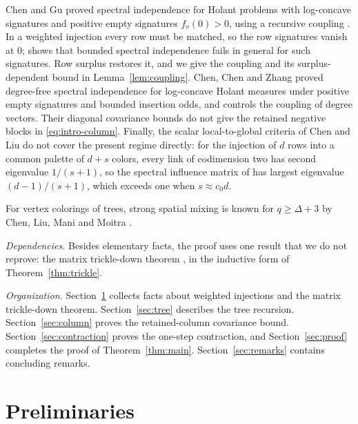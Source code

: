 \documentclass{amsart}
\numberwithin{equation}{section}
\theoremstyle{plain}
\theoremstyle{definition}
\theoremstyle{remark}
\begin{document}
Chen and Gu \cite{CG} proved spectral independence for Holant problems with log-concave signatures and positive empty signatures $f_v(0)>0$, using a recursive coupling \cite[Algorithm~1, Proposition~17 and Lemma~18]{CG}. In a weighted injection every row must be matched, so the row signatures vanish at $0$; \cite[Section~3.4]{CG} shows that bounded spectral independence fails in general for such signatures. Row surplus restores it, and we give the coupling and its surplus-dependent bound in Lemma~\ref{lem:coupling}. Chen, Chen and Zhang \cite[Theorem~4]{CCZ} proved degree-free spectral independence for log-concave Holant measures under positive empty signatures and bounded insertion odds, and \cite[Theorem~13]{CCZ} controls the coupling of degree vectors. Their diagonal covariance bounds do not give the retained negative blocks in \eqref{eq:intro-column}. Finally, the scalar local-to-global criteria of Chen and Liu \cite[Theorems~1.1 and~1.2]{CL} do not cover the present regime directly: for the injection of $d$ rows into a common palette of $d+s$ colors, every link of codimension two has second eigenvalue $1/(s+1)$, so the spectral influence matrix of \cite[Theorem~1.2]{CL} has largest eigenvalue $(d-1)/(s+1)$, which exceeds one when $s\approx c_0d$.

For vertex colorings of trees, strong spatial mixing is known for $q\ge\Delta+3$ by Chen, Liu, Mani and Moitra \cite{CLMM}.

\emph{Dependencies.} Besides elementary facts, the proof uses one result that we do not reprove: the matrix trickle-down theorem \cite[Theorem~3.2]{ALG}, in the inductive form of Theorem~\ref{thm:trickle}.

\emph{Organization.} Section~\ref{sec:prelim} collects facts about weighted injections and the matrix trickle-down theorem. Section~\ref{sec:tree} describes the tree recursion. Section~\ref{sec:column} proves the retained-column covariance bound. Section~\ref{sec:contraction} proves the one-step contraction, and Section~\ref{sec:proof} completes the proof of Theorem~\ref{thm:main}. Section~\ref{sec:remarks} contains concluding remarks.

\section{Preliminaries}\label{sec:prelim}
\end{document}
